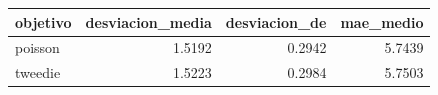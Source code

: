 \begin{tabular}{lrrr}
\toprule
objetivo & desviacion\_media & desviacion\_de & mae\_medio \\
\midrule
poisson & 1.5192 & 0.2942 & 5.7439 \\
tweedie & 1.5223 & 0.2984 & 5.7503 \\
\bottomrule
\end{tabular}
